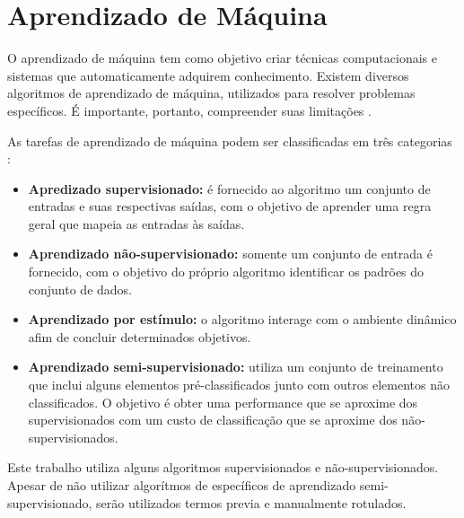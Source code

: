 \clearpage
\chapter{Aprendizado de Máquina}

O aprendizado de máquina tem como objetivo criar técnicas computacionais e sistemas que automaticamente adquirem conhecimento. Existem diversos algoritmos de aprendizado de máquina, utilizados para resolver problemas específicos. É importante, portanto, compreender suas limitações \cite{rezende2003}.

As tarefas de aprendizado de máquina podem ser classificadas em três categorias \cite{russel2003}:

\begin{itemize}
    \item \textbf{Apredizado supervisionado:} é fornecido ao algoritmo um conjunto de entradas e suas respectivas saídas, com o objetivo de aprender uma regra geral que mapeia as entradas às saídas.
    \item \textbf{Aprendizado não-supervisionado:} somente um conjunto de entrada é fornecido, com o objetivo do próprio algoritmo identificar os padrões do conjunto de dados.
    \item \textbf{Aprendizado por estímulo:} o algoritmo interage com o ambiente dinâmico afim de concluir determinados objetivos.
    \item \textbf{Aprendizado semi-supervisionado:} utiliza um conjunto de treinamento que inclui alguns elementos pré-classificados junto com outros elementos não classificados. O objetivo é obter uma performance que se aproxime dos supervisionados com um custo de classificação que se aproxime dos não-supervisionados.
\end{itemize}

Este trabalho utiliza alguns algoritmos supervisionados e não-supervisionados. Apesar de não utilizar algorítmos de específicos de aprendizado semi-supervisionado, serão utilizados termos previa e manualmente rotulados.






